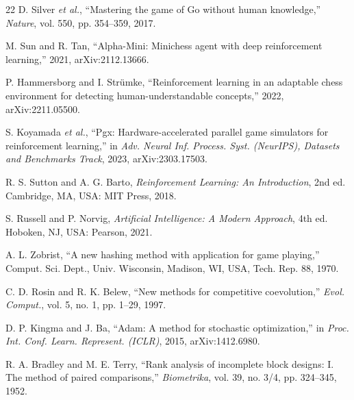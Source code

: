 \begin{thebibliography}{22}
D. Silver \emph{et al.}, ``Mastering the game of Go without human knowledge,'' \emph{Nature}, vol. 550, pp. 354--359, 2017.

M. Sun and R. Tan, ``Alpha-Mini: Minichess agent with deep reinforcement learning,'' 2021, arXiv:2112.13666.

P. Hammersborg and I. Str\"umke, ``Reinforcement learning in an adaptable chess environment for detecting human-understandable concepts,'' 2022, arXiv:2211.05500.

S. Koyamada \emph{et al.}, ``Pgx: Hardware-accelerated parallel game simulators for reinforcement learning,'' in \emph{Adv. Neural Inf. Process. Syst. (NeurIPS), Datasets and Benchmarks Track}, 2023, arXiv:2303.17503.

R. S. Sutton and A. G. Barto, \emph{Reinforcement Learning: An Introduction}, 2nd ed. Cambridge, MA, USA: MIT Press, 2018.

S. Russell and P. Norvig, \emph{Artificial Intelligence: A Modern Approach}, 4th ed. Hoboken, NJ, USA: Pearson, 2021.

A. L. Zobrist, ``A new hashing method with application for game playing,'' Comput. Sci. Dept., Univ. Wisconsin, Madison, WI, USA, Tech. Rep. 88, 1970.

C. D. Rosin and R. K. Belew, ``New methods for competitive coevolution,'' \emph{Evol. Comput.}, vol. 5, no. 1, pp. 1--29, 1997.

D. P. Kingma and J. Ba, ``Adam: A method for stochastic optimization,'' in \emph{Proc. Int. Conf. Learn. Represent. (ICLR)}, 2015, arXiv:1412.6980.

R. A. Bradley and M. E. Terry, ``Rank analysis of incomplete block designs: I. The method of paired comparisons,'' \emph{Biometrika}, vol. 39, no. 3/4, pp. 324--345, 1952.

\end{thebibliography}